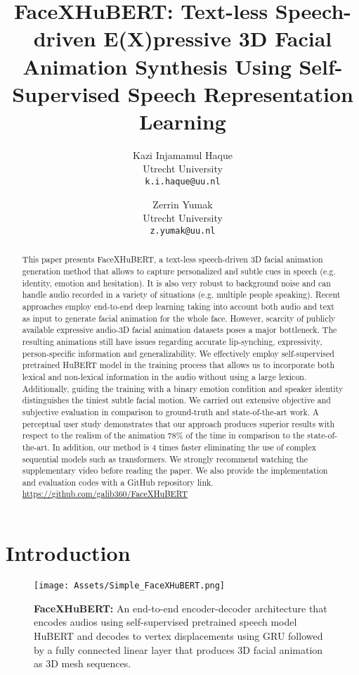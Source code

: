 \documentclass[10pt,twocolumn,letterpaper]{article}
\begin{document}
\title{FaceXHuBERT: Text-less Speech-driven E(X)pressive 3D Facial Animation Synthesis Using Self-Supervised Speech Representation Learning}

\author{Kazi Injamamul Haque\\
Utrecht University\\
{\tt\small k.i.haque@uu.nl}
\and
Zerrin Yumak\\
Utrecht University\\
{\tt\small z.yumak@uu.nl}
}
\maketitle

\begin{abstract}
This paper presents FaceXHuBERT, a text-less speech-driven 3D facial animation generation method that allows to capture personalized and subtle cues in speech (e.g. identity, emotion and hesitation). It is also very robust to background noise and can handle audio recorded in a variety of situations (e.g. multiple people speaking). Recent approaches employ end-to-end deep learning taking into account both audio and text as input to generate facial animation for the whole face. However, scarcity of publicly available expressive audio-3D facial animation datasets poses a major bottleneck. The resulting animations still have issues regarding accurate lip-synching, expressivity, person-specific information and generalizability. We effectively employ self-supervised pretrained HuBERT model in the training process that allows us to incorporate both lexical and non-lexical information in the audio without using a large lexicon. Additionally, guiding the training with a binary emotion condition and speaker identity distinguishes the tiniest subtle facial motion. We carried out extensive objective and subjective evaluation in comparison to ground-truth and state-of-the-art work. A perceptual user study demonstrates that our approach produces superior results with respect to the realism of the animation 78\% of the time in comparison to the state-of-the-art. In addition, our method is 4 times faster eliminating the use of complex sequential models such as transformers. We strongly recommend watching the supplementary video before reading the paper. We also provide the implementation and evaluation codes with a GitHub repository link.
\noindent\footnotesize\url{https://github.com/galib360/FaceXHuBERT}
\end{abstract}

\section{Introduction}
\label{sec:intro}
\begin{figure}[t]
  \centering
   \texttt{[image: Assets/Simple\_FaceXHuBERT.png]}
   \caption{\textbf{FaceXHuBERT:} An end-to-end encoder-decoder architecture that encodes audios using self-supervised pretrained speech model HuBERT and decodes to vertex displacements using GRU followed by a fully connected linear layer that produces 3D facial animation as 3D mesh sequences.}
   \label{fig:model_simple}
   \vspace{-5mm}
\end{figure}
\end{document}
